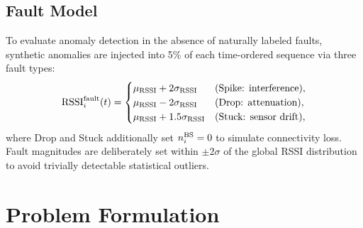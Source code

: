\documentclass[conference]{IEEEtran}
\begin{document}
\subsection{Fault Model}

To evaluate anomaly detection in the absence of naturally labeled faults,
synthetic anomalies are injected into 5\% of each time-ordered sequence
via three fault types:
\begin{equation}
{\rm RSSI}_i^{\rm fault}(t) =
\begin{cases}
\mu_{\rm RSSI} + 2\sigma_{\rm RSSI} & \text{(Spike: interference)},\\
\mu_{\rm RSSI} - 2\sigma_{\rm RSSI} & \text{(Drop: attenuation)},\\
\mu_{\rm RSSI} + 1.5\sigma_{\rm RSSI} & \text{(Stuck: sensor drift)},
\end{cases}
\label{eq:fault}
\end{equation}
where Drop and Stuck additionally set $n^{\rm BS}_i=0$ to simulate
connectivity loss. Fault magnitudes are deliberately set within
$\pm2\sigma$ of the global RSSI distribution to avoid trivially detectable
statistical outliers.

\section{Problem Formulation}
\label{sec:problem}
\end{document}
